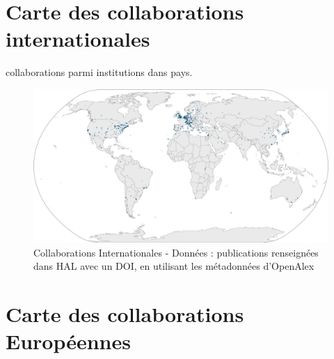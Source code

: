 \documentclass[french, 11pt]{dibiso/biso}
\begin{document}
{
  \footnotesize
  
}

{\footnotesize\journalsinfo}

\pagebreak

\section{Carte des collaborations internationales}

{\collaborationsnb} collaborations parmi {\institutionsnb} institutions dans {\countriesnb} pays.

\begin{figure}[!h]
  \hspace{-.1\textwidth}\includegraphics[width=1.2\textwidth]{figures/collaboration_map_world.pdf}
  \caption{Collaborations Internationales - Données : publications renseignées dans HAL avec un DOI, en utilisant les métadonnées d'OpenAlex}
  \label{fig_collab_map}
\end{figure}

{\footnotesize\collaborationmapworldinfo}

\pagebreak

\section{Carte des collaborations Européennes}
\end{document}

